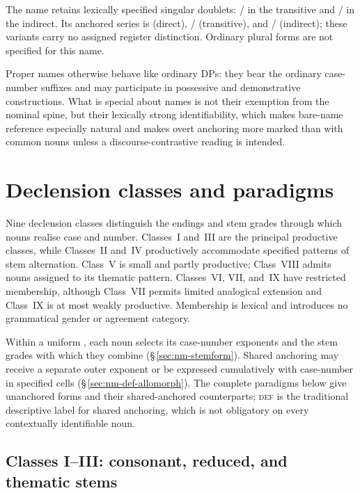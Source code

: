 The name  retains lexically specified singular doublets:
/ in the transitive and
/ in the indirect. Its anchored series is
 (direct), / (transitive), and
/ (indirect); these variants carry no assigned
register distinction. Ordinary plural forms are not specified for this name.

Proper names otherwise behave like ordinary DPs: they bear the ordinary
case-number suffixes and may participate in possessive and demonstrative
constructions. What is special about names is not their exemption from the
nominal spine, but their lexically strong identifiability, which makes
bare-name reference especially natural and makes overt anchoring more marked
than with common nouns unless a discourse-contrastive reading is intended.

\FloatBarrier

\section{Declension classes and paradigms}
\label{sec:nm-declension}

Nine declension classes distinguish the endings and stem grades through which
nouns realise case and number. Classes~I and~III are the principal productive
classes, while Classes~II and~IV productively accommodate specified patterns of
stem alternation. Class~V is small and partly productive; Class~VIII admits
nouns assigned to its thematic pattern. Classes~VI, VII, and~IX have restricted
membership, although Class~VII permits limited analogical extension and
Class~IX is at most weakly productive. Membership is lexical and introduces no
grammatical gender or agreement category.

Within a uniform , each noun selects its case-number exponents and
the stem grades with which they combine (§\,\ref{sec:nm-stemform}). Shared
anchoring may receive a separate outer exponent or be expressed cumulatively
with case-number in specified cells (§\,\ref{sec:nm-def-allomorph}). The complete
paradigms below give unanchored forms and their shared-anchored counterparts;
\textsc{def} is the traditional descriptive label for shared anchoring, which
is not obligatory on every contextually identifiable noun.

\subsection{Classes I--III: consonant, reduced, and thematic stems}
\label{sec:nm-classes-i-iii}

